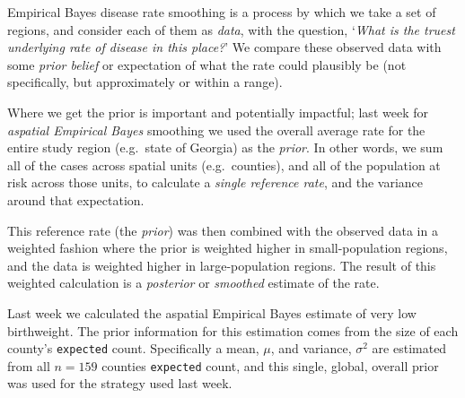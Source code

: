 \documentclass[
]{book}
\newenvironment{Shaded}{\begin{snugshade}}{\end{snugshade}}
\newcommand{\CommentTok}[1]{\textcolor[rgb]{0.56,0.35,0.01}{\textit{#1}}}
\newcommand{\FunctionTok}[1]{\textcolor[rgb]{0.00,0.00,0.00}{#1}}
\newcommand{\NormalTok}[1]{#1}
\newcommand{\OtherTok}[1]{\textcolor[rgb]{0.56,0.35,0.01}{#1}}
\newcommand{\SpecialCharTok}[1]{\textcolor[rgb]{0.00,0.00,0.00}{#1}}
\begin{document}
Empirical Bayes disease rate smoothing is a process by which we take a set of regions, and consider each of them as \emph{data}, with the question, `\emph{What is the truest underlying rate of disease in this place?}' We compare these observed data with some \emph{prior belief} or expectation of what the rate could plausibly be (not specifically, but approximately or within a range).

Where we get the prior is important and potentially impactful; last week for \emph{aspatial Empirical Bayes} smoothing we used the overall average rate for the entire study region (e.g.~state of Georgia) as the \emph{prior}. In other words, we sum all of the cases across spatial units (e.g.~counties), and all of the population at risk across those units, to calculate a \emph{single reference rate}, and the variance around that expectation.

This reference rate (the \emph{prior}) was then combined with the observed data in a weighted fashion where the prior is weighted higher in small-population regions, and the data is weighted higher in large-population regions. The result of this weighted calculation is a \emph{posterior} or \emph{smoothed} estimate of the rate.

Last week we calculated the aspatial Empirical Bayes estimate of very low birthweight. The prior information for this estimation comes from the size of each county's \texttt{expected} count. Specifically a mean, \(\mu\), and variance, \(\sigma^2\) are estimated from all \(n=159\) counties \texttt{expected} count, and this single, global, overall prior was used for the strategy used last week.

\begin{Shaded}
\end{Shaded}
\end{document}
